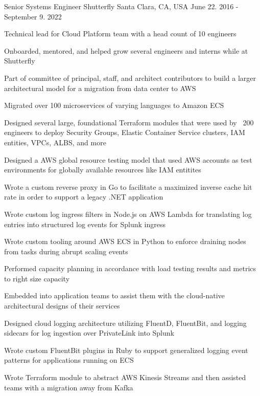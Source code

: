 \begin{cventries}
  \cventry
    {Senior Systems Engineer} %
    {Shutterfly} %
    {Santa Clara, CA, USA} %
    {June 22. 2016 - September 9. 2022} %
    {
      \begin{cvitems}
        \item {Technical lead for Cloud Platform team with a head count of 10 engineers}
        \item {Onboarded, mentored, and helped grow several engineers and interns while at Shutterfly}
        \item {Part of committee of principal, staff, and architect contributors to build a larger architectural model for a migration from data center to AWS}
        \item {Migrated over 100 microservices of varying languages to Amazon ECS}
        \item {Designed several large, foundational Terraform modules that were used by ~200 engineers to deploy Security Groups, Elastic Container Service clusters, IAM entities, VPCs, ALBS, and more}
        \item {Designed a AWS global resource testing model that used AWS accounts as test environments for globally available resources like IAM entitites}
        \item {Wrote a custom reverse proxy in Go to facilitate a maximized inverse cache hit rate in order to support a legacy .NET application}
        \item {Wrote custom log ingress filters in Node.js on AWS Lambda for translating log entries into structured log events for Splunk ingress}
        \item {Wrote custom tooling around AWS ECS in Python to enforce draining nodes from tasks during abrupt scaling events}
        \item {Performed capacity planning in accordance with load testing results and metrics to right size capacity}
        \item {Embedded into application teams to assist them with the cloud-native architectural designs of their services}
        \item {Designed cloud logging architecture utilizing FluentD, FluentBit, and logging sidecars for log ingestion over PrivateLink into Splunk}
        \item Wrote custom FluentBit plugins in Ruby to support generalized logging event patterns for applications running on ECS
        \item {Wrote Terraform module to abstract AWS Kinesis Streams and then assisted teams with a migration away from Kafka}

\end{cvitems}}
\end{cventries}

